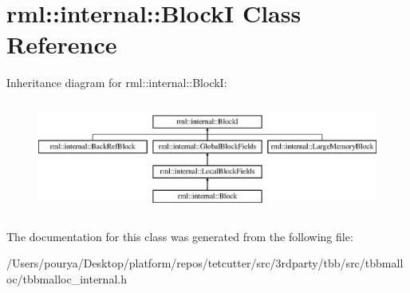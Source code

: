 \hypertarget{classrml_1_1internal_1_1BlockI}{}\section{rml\+:\+:internal\+:\+:Block\+I Class Reference}
\label{classrml_1_1internal_1_1BlockI}
Inheritance diagram for rml\+:\+:internal\+:\+:Block\+I\+:\begin{figure}[H]
\begin{center}
\leavevmode
\includegraphics[height=3.714760cm]{classrml_1_1internal_1_1BlockI}
\end{center}
\end{figure}


The documentation for this class was generated from the following file\+:\begin{DoxyCompactItemize}
\item 
/\+Users/pourya/\+Desktop/platform/repos/tetcutter/src/3rdparty/tbb/src/tbbmalloc/tbbmalloc\+\_\+internal.\+h\end{DoxyCompactItemize}
